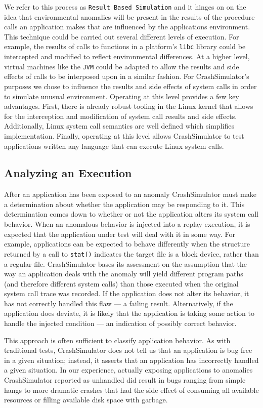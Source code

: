 We refer to this process as {\tt Result Based Simulation} and it hinges on
on the idea that environmental anomalies will be present in the results of
the procedure calls an application makes that are influenced by the
applications environment.
This technique could be carried out several different levels
of execution.  For example, the results of calls to functions in a
platform's {\tt libc} library could be intercepted and modified to reflect
environmental differences.  At a higher level, virtual machines like the
{\tt JVM} could be adapted to allow the results and side effects of calls
to be interposed upon in a similar fashion.
For CrashSimulator's purposes we chose to influence
the results and side effects of system calls in order to simulate
unusual environment.  Operating at this level provides a few key
advantages.  First, there is already robust tooling in the Linux kernel
that allows for the interception and modification of system call results
and side effects.  Additionally, Linux system call semantics are well
defined which simplifies implementation.  Finally, operating at this level
allows CrashSimulator to test applications written any language that can
execute Linux system calls.

\subsection{Analyzing an Execution}

After an application has been exposed to an anomaly CrashSimulator must
make a determination about whether the application may be responding to it.
This determination comes down to whether or not
the application alters its
system call behavior.  When an anomalous
behavior is injected into a replay execution,
it is expected that the application under
test will deal with it in some way.  For example, applications can
be expected to behave differently when the structure returned by a call to
{\tt stat()} indicates the target file is a block device,
rather than a regular
file.  CrashSimulator bases its assessment on the assumption that the way
an
application deals with the anomaly will yield
different program paths (and therefore different system calls) than
those
executed when the original system call trace was recorded.
If the application
does not alter its behavior, it has not
correctly handled this flaw --- a failing result.  Alternatively, if the
application does deviate, it is likely that the application is taking some
action to handle the injected condition --- an indication of possibly
correct behavior.

This approach is often sufficient to classify application behavior.  As
with traditional tests, CrashSimulator does not tell us that an application
is bug free in a given situation; instead, it asserts that an application
has incorrectly handled a given situation.  In our experience, actually
exposing applications to anomalies CrashSimulator reported as unhandled
did result
in bugs ranging from simple hangs to more dramatic crashes that
had the side effect of consuming all available resources or filling
available disk space with garbage.
